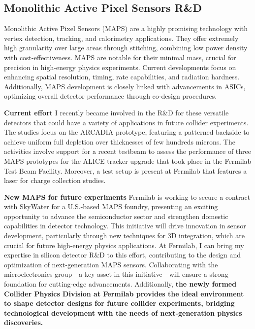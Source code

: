 {\begin{flushleft}
\vskip 10pt 
\subsection{Monolithic Active Pixel Sensors R\&D}
\vskip 5pt
Monolithic Active Pixel Sensors (MAPS) are a highly promising technology with vertex detection, tracking, and calorimetry applications. They offer extremely high granularity over large areas through stitching, combining low power density with cost-effectiveness. MAPS are notable for their minimal mass, crucial for precision in high-energy physics experiments.
Current developments focus on enhancing spatial resolution, timing, rate capabilities, and radiation hardness. Additionally, MAPS development is closely linked with advancements in ASICs, optimizing overall detector performance through co-design procedures.

\textbf{Current effort}
I recently became involved in the R\&D for these versatile detectors that could have a variety of applications in future collider experiments. The studies focus on the ARCADIA prototype, featuring a patterned backside to achieve uniform full depletion over thicknesses of few hundreds microns. The activities involve support for a recent testbeam to assess the performance of three MAPS prototypes for the ALICE tracker upgrade that took place in the Fermilab Test Beam Facility. Moreover, a test setup is present at Fermilab that features a laser for charge collection studies.

\textbf{New MAPS for future experiments}
Fermilab is working to secure a contract with SkyWater for a U.S.-based MAPS foundry, presenting an exciting opportunity to advance the semiconductor sector and strengthen domestic capabilities in detector technology. This initiative will drive innovation in sensor development, particularly through new techniques for 3D integration, which are crucial for future high-energy physics applications.
At Fermilab, I can bring my expertise in silicon detector R\&D to this effort, contributing to the design and optimization of next-generation MAPS sensors. Collaborating with the microelectronics group—a key asset in this initiative—will ensure a strong foundation for cutting-edge advancements. Additionally, \textbf{the newly formed Collider Physics Division at Fermilab provides the ideal environment to shape detector designs for future collider experiments, bridging technological development with the needs of next-generation physics discoveries.}



\end{flushleft}}
